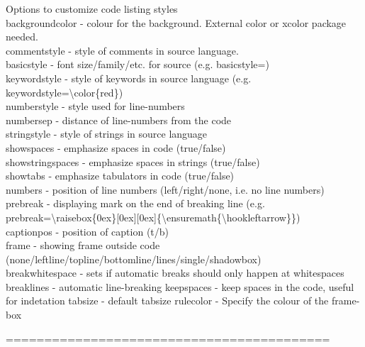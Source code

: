 \documentclass{article}
\begin{document}
	Options to customize code listing styles\\
	backgroundcolor - colour for the background. External color or xcolor package needed.\\
	commentstyle - style of comments in source language.\\
	basicstyle - font size/family/etc. for source (e.g. basicstyle=\ttfamily\small)\\
	keywordstyle - style of keywords in source language (e.g. keywordstyle=\textbackslash color\{red\})\\
	numberstyle - style used for line-numbers\\
	numbersep - distance of line-numbers from the code\\
	stringstyle - style of strings in source language\\
	showspaces - emphasize spaces in code (true/false)\\
	showstringspaces - emphasize spaces in strings (true/false)\\
	showtabs - emphasize tabulators in code (true/false)\\
	numbers - position of line numbers (left/right/none, i.e. no line numbers)\\
	prebreak - displaying mark on the end of breaking line (e.g. prebreak=\textbackslash raisebox\{0ex\}[0ex][0ex]\{\textbackslash ensuremath\{\textbackslash hookleftarrow\}\})\\
	captionpos - position of caption (t/b)\\
	frame - showing frame outside code (none/leftline/topline/bottomline/lines/single/shadowbox)\\
	breakwhitespace - sets if automatic breaks should only happen at whitespaces
	breaklines - automatic line-breaking
	keepspaces - keep spaces in the code, useful for indetation
	tabsize - default tabsize
	rulecolor - Specify the colour of the frame-box
	
	==========================================\\\\
	
\end{document}

